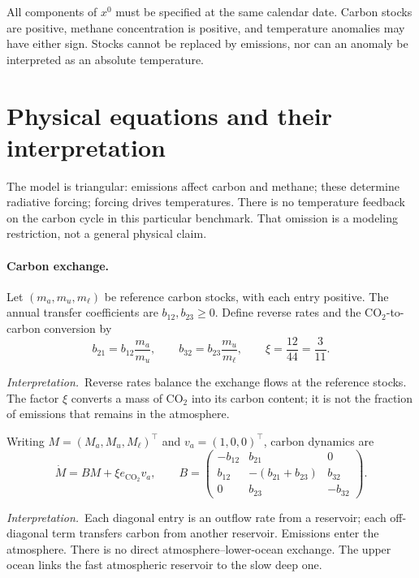 \documentclass[11pt,a4paper]{article}
\newcommand{\interp}{\par\smallskip\noindent\textit{Interpretation.}\ }
\begin{document}
All components of $x^0$ must be specified at the same calendar date.
Carbon stocks are positive, methane concentration is positive, and
temperature anomalies may have either sign. Stocks cannot be replaced
by emissions, nor can an anomaly be interpreted as an absolute temperature.

\section{Physical equations and their interpretation}
The model is triangular: emissions affect carbon and methane; these
determine radiative forcing; forcing drives temperatures. There is no
temperature feedback on the carbon cycle in this particular benchmark.
That omission is a modeling restriction, not a general physical claim.

\paragraph{Carbon exchange.}
Let $(m_a,m_u,m_\ell)$ be reference carbon stocks, with each entry positive.
The annual transfer coefficients are $b_{12},b_{23}\geq0$.
Define reverse rates and the CO$_2$-to-carbon conversion by
\begin{equation}\label{eq:rates}
 b_{21}=b_{12}\frac{m_a}{m_u},\qquad
 b_{32}=b_{23}\frac{m_u}{m_\ell},\qquad
 \xi=\frac{12}{44}=\frac{3}{11}.
\end{equation}
\interp Reverse rates balance the exchange flows at the reference stocks.
The factor $\xi$ converts a mass of CO$_2$ into its carbon content;
it is not the fraction of emissions that remains in the atmosphere.

Writing $M=(M_a,M_u,M_\ell)^\top$ and $v_a=(1,0,0)^\top$, carbon dynamics are
\begin{equation}\label{eq:carbon}
 \dot M=BM+\xi e_{\mathrm{CO_2}}v_a,\qquad
 B=\begin{pmatrix}
 -b_{12}&b_{21}&0\\
 b_{12}&-(b_{21}+b_{23})&b_{32}\\
 0&b_{23}&-b_{32}
 \end{pmatrix}.
\end{equation}
\interp Each diagonal entry is an outflow rate from a reservoir; each
off-diagonal term transfers carbon from another reservoir. Emissions enter
the atmosphere. There is no direct atmosphere--lower-ocean exchange.
The upper ocean links the fast atmospheric reservoir to the slow deep one.
\end{document}
